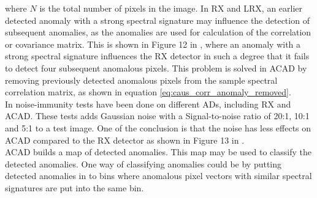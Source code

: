 where $N$ is the total number of pixels in the image. In  RX and LRX, an earlier detected anomaly with a strong spectral signature may influence the detection of subsequent anomalies, as the anomalies are used for calculation of the correlation or covariance matrix. This is shown in Figure 12 in \cite{chang2006characterization}, where an anomaly with a strong spectral signature influences the RX detector in such a degree that it fails to detect four subsequent anomalous pixels. This problem is solved in ACAD by removing previously detected anomalous pixels from the sample spectral correlation matrix, as shown in equation \ref{eq:caus_corr_anomaly_removed}. 
\\

In \cite{chang2006characterization} noise-immunity tests have been done on different ADs, including RX and ACAD. These tests adds Gaussian noise with a Signal-to-noise ratio of 20:1, 10:1 and 5:1 to a test image. One of the conclusion is that the noise has less effects on ACAD compared to the RX detector as shown in Figure 13 in \cite{chang2006characterization}.
\\


ACAD builds a map of detected anomalies. This map may be used to classify the detected anomalies. One way of classifying anomalies could be by putting detected anomalies in to bins where anomalous pixel vectors with similar spectral signatures are put into the same bin. 
\\


